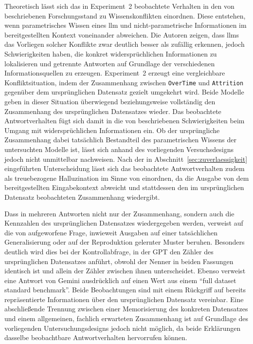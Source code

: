 Theoretisch lässt sich das in Experiment~2 beobachtete Verhalten in den von \textcite{wang_resolving_2024} beschriebenen Forschungsstand zu Wissenskonflikten einordnen. Diese entstehen, wenn parametrisches Wissen eines \gls{llm} und nicht-parametrische Informationen im bereitgestellten Kontext voneinander abweichen. Die Autoren zeigen, dass \glspl{llm} das Vorliegen solcher Konflikte zwar deutlich besser als zufällig erkennen, jedoch Schwierigkeiten haben, die konkret widersprüchlichen Informationen zu lokalisieren und getrennte Antworten auf Grundlage der verschiedenen Informationsquellen zu erzeugen. Experiment~2 erzeugt eine vergleichbare Konfliktsituation, indem der Zusammenhang zwischen \texttt{OverTime} und \texttt{Attrition} gegenüber dem ursprünglichen Datensatz gezielt umgekehrt wird. Beide Modelle geben in dieser Situation überwiegend beziehungsweise vollständig den Zusammenhang des ursprünglichen Datensatzes wieder. Das beobachtete Antwortverhalten fügt sich damit in die von \textcite{wang_resolving_2024} beschriebenen Schwierigkeiten beim Umgang mit widersprüchlichen Informationen ein. Ob der ursprüngliche Zusammenhang dabei tatsächlich Bestandteil des parametrischen Wissens der untersuchten Modelle ist, lässt sich anhand des vorliegenden Versuchsdesigns jedoch nicht unmittelbar nachweisen. Nach der in Abschnitt~\ref{sec:zuverlaessigkeit} eingeführten Unterscheidung lässt sich das beobachtete Antwortverhalten zudem als treuebezogene Halluzination im Sinne von \textcite{bai_hallucination_2025} einordnen, da die Ausgabe von dem bereitgestellten Eingabekontext abweicht und stattdessen den im ursprünglichen Datensatz beobachteten Zusammenhang wiedergibt.

Dass in mehreren Antworten nicht nur der Zusammenhang, sondern auch die Kennzahlen des ursprünglichen Datensatzes wiedergegeben werden, verweist auf die von \textcite{wang_generalization_2024} aufgeworfene Frage, inwieweit Ausgaben auf einer tatsächlichen Generalisierung oder auf der Reproduktion gelernter Muster beruhen. Besonders deutlich wird dies bei der Kontrollabfrage, in der GPT den Zähler des ursprünglichen Datensatzes anführt, obwohl der Nenner in beiden Fassungen identisch ist und allein der Zähler zwischen ihnen unterscheidet. Ebenso verweist eine Antwort von Gemini ausdrücklich auf einen Wert aus einem \enquote{full dataset standard benchmark}. Beide Beobachtungen sind mit einem Rückgriff auf bereits repräsentierte Informationen über den ursprünglichen Datensatz vereinbar. Eine abschließende Trennung zwischen einer Memorisierung des konkreten Datensatzes und einem allgemeinen, fachlich erwarteten Zusammenhang ist auf Grundlage des vorliegenden Untersuchungsdesigns jedoch nicht möglich, da beide Erklärungen dasselbe beobachtbare Antwortverhalten hervorrufen können.

